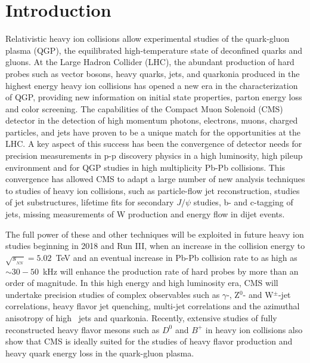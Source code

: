 \section{Introduction} \label{sec:intro}

Relativistic heavy ion collisions allow experimental studies of the quark-gluon plasma (QGP), the equilibrated
high-temperature state of deconfined quarks and gluons. At the Large Hadron Collider (LHC), the abundant production of
hard probes such as vector bosons, heavy quarks, jets, and quarkonia produced in the highest energy heavy ion collisions
has opened a new era in the characterization of QGP, providing new information on initial state properties, parton
energy loss and color screening. The capabilities of the Compact Muon Solenoid (CMS) detector in the detection of high
momentum photons, electrons, muons, charged particles, and jets have proven to be a unique match for the opportunities
at the LHC. A key aspect of this success has been the convergence of detector needs for precision measurements in p-p
discovery physics in a high luminosity, high pileup environment and for QGP studies in high multiplicity Pb-Pb
collisions. This convergence has allowed CMS to adapt a large number of new analysis techniques to studies of heavy ion
collisions, such as particle-flow jet reconstruction, studies of jet substructures, lifetime fits for secondary $J/\psi$
studies,  b- and c-tagging of jets, missing \pt measurements of W production and energy flow in dijet events.

The full power of these and other techniques will be exploited in future heavy ion studies beginning in 2018 and Run
III, when an increase in the collision energy to $\sqrt{s_{_{NN}}} = 5.02$~TeV and an eventual increase in Pb-Pb
collision rate to as high as $\sim 30-50$~kHz will enhance the production rate of hard probes by more than an order of
magnitude. In this high energy and high luminosity era, CMS will undertake precision studies of complex observables such
as $\gamma$-, Z$^0$- and W$^\pm$-jet correlations, heavy flavor jet quenching, multi-jet correlations and the azimuthal
anisotropy of high \pt\ jets and quarkonia. Recently, extensive studies of fully reconstructed heavy flavor mesons such
as $D^0$ and $B^+$ in heavy ion collisions also show that CMS is ideally suited for the studies of heavy flavor
production and heavy quark energy loss in the quark-gluon plasma.


